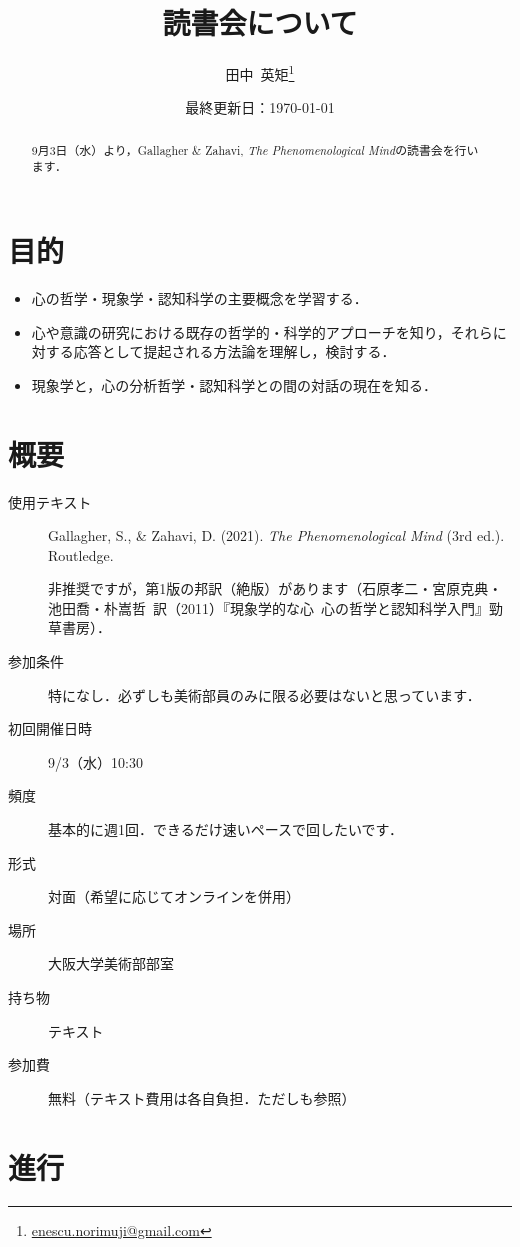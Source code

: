 \documentclass[b5j]{ltjsarticle}
\title{\sffamily 読書会について}
\author{田中\ 英矩\thanks{\url{enescu.norimuji@gmail.com}}}
\date{最終更新日：\today}
\begin{document}
\maketitle

\begin{abstract}
  9月3日（水）より，Gallagher \& Zahavi, \textit{The Phenomenological Mind}の読書会を行います．
\end{abstract}

\section{目的}

\begin{itemize}
  \item 心の哲学・現象学・認知科学の主要概念を学習する．
  \item 心や意識の研究における既存の哲学的・科学的アプローチを知り，それらに対する応答として提起される方法論を理解し，検討する．
  \item 現象学と，心の分析哲学・認知科学との間の対話の現在を知る．
\end{itemize}


\section{概要}

\begin{description}
  \item[使用テキスト] Gallagher, S., \& Zahavi, D. (2021). \textit{The Phenomenological Mind} (3rd ed.). Routledge.\par
  非推奨ですが，第1版の邦訳（絶版）があります（石原孝二・宮原克典・池田喬・朴嵩哲\ 訳（2011）『現象学的な心\ 心の哲学と認知科学入門』勁草書房）．
  \item[参加条件] 特になし．必ずしも美術部員のみに限る必要はないと思っています．
  \item[初回開催日時] 9/3（水）10:30
  \item[頻度] 基本的に週1回．できるだけ速いペースで回したいです．
  \item[形式] 対面（希望に応じてオンラインを併用）
  \item[場所] 大阪大学美術部部室
  \item[持ち物] テキスト
  \item[参加費] 無料（テキスト費用は各自負担．ただしも参照）
\end{description}


\section{進行}
\end{document}
